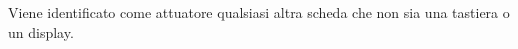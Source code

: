 \documentclass{article}
\begin{document}
    Viene identificato come attuatore qualsiasi altra scheda che non sia una tastiera o un display. 
    
%    
%    
%    
%       
%       
\end{document}
